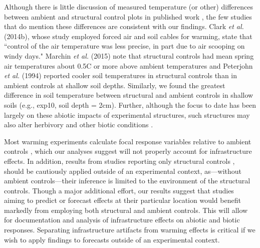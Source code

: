 \documentclass{article}
\begin{document}
\par Although there is little discussion of measured temperature (or other) differences between ambient and structural control plots in published work \citep[e.g.,][]{farnsworth1995,pelini2011,clark2014a}, the few studies that do mention these differences are consistent with our findings. Clark \textit{et al.} (2014b), whose study employed forced air and soil cables for warming, state that ``control of the air temperature was less precise, in part due to air scooping on windy days." Marchin \textit{et al.} (2015) note that structural controls had mean spring air temperatures about  0.5\degree C or more above ambient temperatures and Peterjohn \textit{et al.} (1994) reported cooler soil temperatures in structural controls than in ambient controls at shallow soil depths. Similarly, we found the greatest difference in soil temperature between structural and ambient controls in shallow soils (e.g., exp10, soil depth = 2cm). Further, although the focus to date has been largely on these abiotic impacts of experimental structures, such structures may also alter herbivory and other biotic conditions \citep{kennedy1995,moise2010,wolkovich2012,hoeppner2012}. 

\par Most warming experiments calculate focal response variables relative to ambient controls \citep [e.g.,][]{price1998,dunne2003,cleland2006,morin2010,marchin2015}, which our analyses suggest will not properly account for infrastructure effects. In addition, results from studies reporting only structural controls \citep [e.g.,][]{sherry2007,hoeppner2012, rollinson2012}, should be cautiously applied outside of an experimental context, as---without ambient controls---their inference is limited to the environment of the structural controls. Though a major additional effort, our results suggest that studies aiming to predict or forecast effects at their particular location would benefit markedly from employing both structural and ambient controls. This will allow for documentation and analysis of infrastructure effects on abiotic and biotic responses. Separating infrastructure artifacts from warming effects is critical if we wish to apply findings to forecasts outside of an experimental context. 
\end{document}
